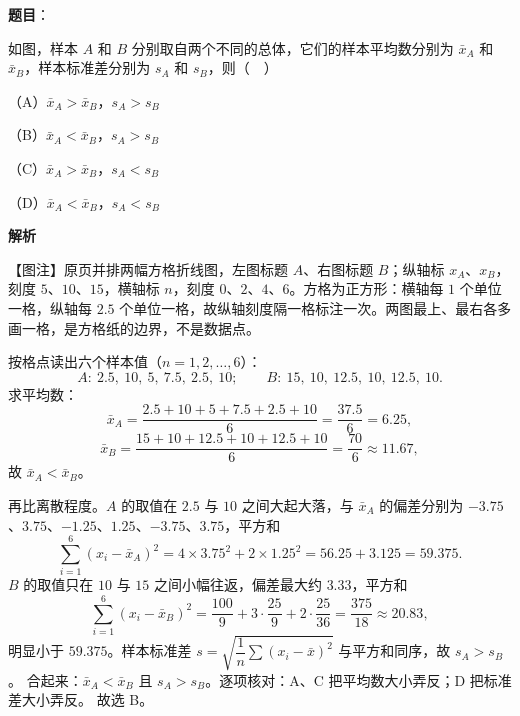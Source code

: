 \begin{answer}

\textbf{题目}：

如图，样本 $A$ 和 $B$ 分别取自两个不同的总体，它们的样本平均数分别为 $\bar x_A$ 和 $\bar x_B$，样本标准差分别为 $s_A$ 和 $s_B$，则（　）

（A）$\bar x_A>\bar x_B$，$s_A>s_B$

（B）$\bar x_A<\bar x_B$，$s_A>s_B$

（C）$\bar x_A>\bar x_B$，$s_A<s_B$

（D）$\bar x_A<\bar x_B$，$s_A<s_B$
\nopagebreak[4]
\begin{center}\end{center}
\nopagebreak[4]
\textbf{解析}

【图注】原页并排两幅方格折线图，左图标题 $A$、右图标题 $B$；纵轴标 $x_A$、$x_B$，刻度 $5$、$10$、$15$，横轴标 $n$，刻度 $0$、$2$、$4$、$6$。方格为正方形：横轴每 $1$ 个单位一格，纵轴每 $2.5$ 个单位一格，故纵轴刻度隔一格标注一次。两图最上、最右各多画一格，是方格纸的边界，不是数据点。

按格点读出六个样本值（$n=1,2,\dots,6$）：
\nopagebreak[4]
\[A:\ 2.5,\ 10,\ 5,\ 7.5,\ 2.5,\ 10;\qquad B:\ 15,\ 10,\ 12.5,\ 10,\ 12.5,\ 10.\]
求平均数：
\nopagebreak[4]
\[\bar x_A=\frac{2.5+10+5+7.5+2.5+10}{6}=\frac{37.5}{6}=6.25,\]
\nopagebreak[4]
\[\bar x_B=\frac{15+10+12.5+10+12.5+10}{6}=\frac{70}{6}\approx 11.67,\]
故 $\bar x_A<\bar x_B$。

再比离散程度。$A$ 的取值在 $2.5$ 与 $10$ 之间大起大落，与 $\bar x_A$ 的偏差分别为 $-3.75$、$3.75$、$-1.25$、$1.25$、$-3.75$、$3.75$，平方和
\nopagebreak[4]
\[\sum_{i=1}^{6}(x_i-\bar x_A)^2=4\times 3.75^2+2\times 1.25^2=56.25+3.125=59.375.\]
$B$ 的取值只在 $10$ 与 $15$ 之间小幅往返，偏差最大约 $3.33$，平方和
\nopagebreak[4]
\[\sum_{i=1}^{6}(x_i-\bar x_B)^2=\frac{100}{9}+3\cdot\frac{25}{9}+2\cdot\frac{25}{36}=\frac{375}{18}\approx 20.83,\]
明显小于 $59.375$。样本标准差 $s=\sqrt{\dfrac1n\sum(x_i-\bar x)^2}$ 与平方和同序，故 $s_A>s_B$。
合起来：$\bar x_A<\bar x_B$ 且 $s_A>s_B$。逐项核对：A、C 把平均数大小弄反；D 把标准差大小弄反。
故选 B。


\end{answer}

